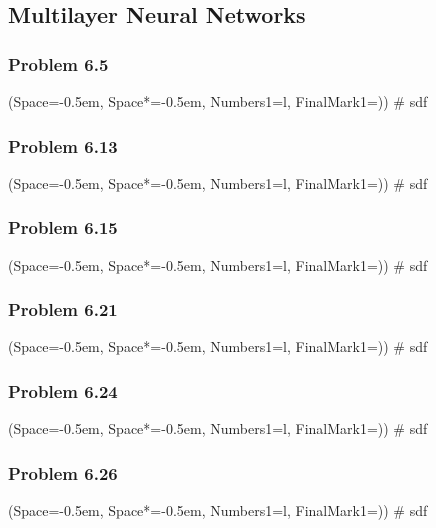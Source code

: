 \documentclass[12pt, a4paper]{article}
\newcommand{\listSpace}{-0.5em}%
\begin{document}
{\clearpage
\subsection{Multilayer Neural Networks}

\subsubsection*{Problem 6.5}
\begin{easylist}[enumerate]
\ListProperties(Space=\listSpace, Space*=\listSpace, Numbers1=l, FinalMark1={)})
# sdf
\end{easylist}

\subsubsection*{Problem 6.13}
\begin{easylist}[enumerate]
	\ListProperties(Space=\listSpace, Space*=\listSpace, Numbers1=l, FinalMark1={)})
	# sdf
\end{easylist}

\subsubsection*{Problem 6.15}
\begin{easylist}[enumerate]
	\ListProperties(Space=\listSpace, Space*=\listSpace, Numbers1=l, FinalMark1={)})
	# sdf
\end{easylist}

\subsubsection*{Problem 6.21}
\begin{easylist}[enumerate]
	\ListProperties(Space=\listSpace, Space*=\listSpace, Numbers1=l, FinalMark1={)})
	# sdf
\end{easylist}

\subsubsection*{Problem 6.24}
\begin{easylist}[enumerate]
	\ListProperties(Space=\listSpace, Space*=\listSpace, Numbers1=l, FinalMark1={)})
	# sdf
\end{easylist}

\subsubsection*{Problem 6.26}
\begin{easylist}[enumerate]
	\ListProperties(Space=\listSpace, Space*=\listSpace, Numbers1=l, FinalMark1={)})
	# sdf
\end{easylist}

}
\end{document}
